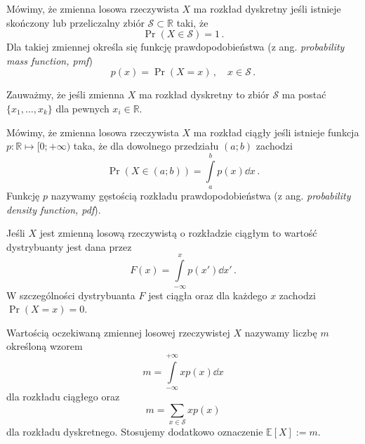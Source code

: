 \documentclass{myclass}
\numberwithin{equation}{subsection}
\begin{document}
\begin{definition}
Mówimy, że zmienna losowa rzeczywista \(X\) ma rozkład dyskretny jeśli istnieje skończony lub
przeliczalny zbiór \(\mathcal{S} \subset \mathbb{R}\) taki, że
\begin{equation*}
    \Pr( X \in \mathcal{S} ) = 1\,.
\end{equation*}
Dla takiej zmiennej określa się funkcję prawdopodobieństwa (z ang. \textit{probability mass
function, pmf})
\begin{equation*}
    p(x) = \Pr(X = x)\,,\quad x \in \mathcal{S}\,.
\end{equation*}
\end{definition}

Zauważmy, że jeśli zmienna \(X\) ma rozkład dyskretny to zbiór \(\mathcal{S}\) ma postać
\(\{x_1,\ldots,x_k\}\) dla pewnych \(x_i \in \mathbb{R}\).

\begin{definition}
Mówimy, że zmienna losowa rzeczywista \(X\) ma rozkład ciągły jeśli istnieje funkcja \(p: \mathbb{R}
\mapsto [0; +\infty)\) taka, że dla dowolnego przedziału \((a;b)\) zachodzi
\begin{equation*}
    \Pr(X \in (a;b)) = \int\limits_a^b p(x) \dd{x}\,.
\end{equation*}
Funkcję \(p\) nazywamy gęstością rozkładu prawdopodobieństwa (z ang. \textit{probability density
function, pdf}).
\end{definition}

Jeśli \(X\) jest zmienną losową rzeczywistą o rozkładzie ciągłym to wartość dystrybuanty jest dana
przez
\begin{equation}
    F(x) = \int\limits_{-\infty}^x p(x') \dd{x'}\,.
\end{equation}
W szczególności dystrybuanta \(F\) jest ciągła oraz dla każdego \(x\) zachodzi \(\Pr(X = x) = 0\).

\begin{definition}
Wartością oczekiwaną zmiennej losowej rzeczywistej \(X\) nazywamy liczbę \(m\) określoną wzorem
\begin{equation*}
    m = \int\limits_{-\infty}^{+\infty} x p(x) \dd{x}
\end{equation*}
dla rozkładu ciągłego oraz
\begin{equation*}
    m = \sum_{x \in \mathcal{S}} x p(x)
\end{equation*}
dla rozkładu dyskretnego. Stosujemy dodatkowo oznaczenie \(\mathbb{E}[X] := m\).
\end{definition}
\end{document}
